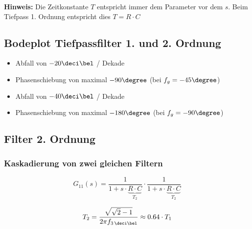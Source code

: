 \textbf{Hinweis:} Die Zeitkonstante $T$ entspricht immer dem Parameter vor dem $s$. 
Beim Tiefpass 1. Ordnung entspricht dies $T = R \cdot C$

\subsection{Bodeplot Tiefpassfilter 1. und 2. Ordnung}

\begin{minipage}[t]{0.48\columnwidth}
    \begin{center}
    \end{center}
    \begin{itemize}
        \item Abfall von $- 20 \deci \bel$ / Dekade
        \item Phasenschiebung von maximal $- 90 \degree$ (bei $f_g = -45 \degree$)
    \end{itemize}
\end{minipage}
\hfill
\begin{minipage}[t]{0.48\columnwidth}
    \begin{center}
    \end{center}
    \begin{itemize}
        \item Abfall von $- 40 \deci \bel$ / Dekade
        \item Phasenschiebung von maximal $- 180 \degree$ (bei $f_g = -90 \degree$)
    \end{itemize}
\end{minipage}


\subsection{Filter 2. Ordnung}

\subsubsection{Kaskadierung von zwei gleichen Filtern}

\begin{minipage}[c]{0.48\columnwidth}
    $$ G_{11}(s) = \frac{1}{1 + s \cdot \underbrace{R \cdot C}_{T_2}} \cdot \frac{1}{1 + s \cdot \underbrace{R \cdot C}_{T_2}} $$
\end{minipage}
\hfill
\begin{minipage}[c]{0.48\columnwidth}
    $$ T_2 = \frac{\sqrt{\sqrt{2} - 1}}{2 \pi f_{3 \, \deci \bel} } \approx 0.64 \cdot T_1  $$
\end{minipage}

